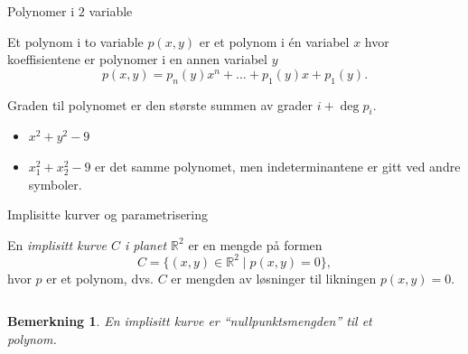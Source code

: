 \documentclass[norsk]{beamer}
\theoremstyle{example}
\newtheorem{remark}{Bemerkning}
\begin{document}
\begin{frame}{Polynomer i $2$ variable}
    \begin{definition}
        Et polynom i to variable $p(x,y)$
        er et polynom i \'en variabel $x$ hvor koeffisientene
        er polynomer i en annen variabel $y$
        \[
            p(x, y) = p_n(y) x^n + \dots + p_1(y) x + p_1(y).
        \]

        Graden til polynomet er den største summen av grader
        $i + \deg p_i$.
    \end{definition}
    \begin{example}
        \begin{itemize}
            \item $x^2 + y^2 - 9$
            \item $x_1^2 + x_2^2 - 9$ er det samme polynomet,
                men indeterminantene er gitt ved andre symboler.
        \end{itemize}
    \end{example}
\end{frame}

\begin{frame}{Implisitte kurver og parametrisering}
    \begin{definition}
        En \textit{implisitt kurve $C$ i planet $\mathbb R^2$}
        er en mengde på formen
        \[
            C = \{ (x,y)\in \mathbb R^2 \mid p(x,y) = 0\},
        \]
        hvor $p$ er et polynom,
        dvs. $C$ er mengden av løsninger til likningen $p(x,y) = 0$.
    \end{definition}
    \begin{columns}
        \begin{column}{.4\textwidth}
            \begin{remark}
                En implisitt kurve er ``nullpunktsmengden'' til et polynom.
            \end{remark}
        \end{column}
        \begin{column}{.6\textwidth}
            \begin{figure}
                \centering
            \end{figure}
        \end{column}
    \end{columns}
\end{frame}
\end{document}
